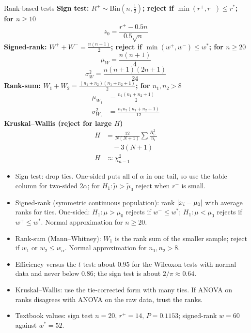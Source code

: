 \begin{formulabox}{Rank-based tests}
\textbf{Sign test: $R^+\sim\mathrm{Bin}(n,\tfrac12)$; reject if $\min(r^+,r^-)\le r^*$; for $n\ge10$}
\[ z_0=\frac{r^+-0.5n}{0.5\sqrt n} \]
\textbf{Signed-rank: $W^++W^-=\frac{n(n+1)}2$; reject if $\min(w^+,w^-)\le w^*$; for $n\ge20$}
\[ \mu_W=\frac{n(n+1)}{4} \]
\[ \sigma_W^2=\frac{n(n+1)(2n+1)}{24} \]
\textbf{Rank-sum: $W_1+W_2=\frac{(n_1+n_2)(n_1+n_2+1)}2$; for $n_1,n_2>8$}
\[ \begin{aligned}\mu_{W_1}&=\frac{n_1(n_1+n_2+1)}{2}\\[4pt] \sigma^2_{W_1}&=\frac{n_1n_2(n_1+n_2+1)}{12}\end{aligned} \]
\textbf{Kruskal--Wallis (reject for large $H$)}
\[ \begin{aligned}H&=\frac{12}{N(N+1)}\sum\frac{R_{i\cdot}^2}{n_i}\\ &\quad-3(N+1)\\ H&\approx\chi^2_{a-1}\end{aligned} \]
\end{formulabox}

\begin{notebox}
\begin{itemize}
  \item Sign test: drop ties. One-sided puts all of $\alpha$ in one tail, so use the table column for two-sided $2\alpha$; for $H_1:\tilde\mu>\tilde\mu_0$ reject when $r^-$ is small.
  \item Signed-rank (symmetric continuous population): rank $\lvert x_i-\mu_0\rvert$ with average ranks for ties. One-sided: $H_1:\mu>\mu_0$ rejects if $w^-\le w^*$; $H_1:\mu<\mu_0$ rejects if $w^+\le w^*$. Normal approximation for $n\ge20$.
  \item Rank-sum (Mann--Whitney): $W_1$ is the rank sum of the smaller sample; reject if $w_1$ or $w_2\le w_\alpha$. Normal approximation for $n_1,n_2>8$.
  \item Efficiency versus the $t$-test: about $0.95$ for the Wilcoxon tests with normal data and never below $0.86$; the sign test is about $2/\pi\approx0.64$.
  \item Kruskal--Wallis: use the tie-corrected form with many ties. If ANOVA on ranks disagrees with ANOVA on the raw data, trust the ranks.
  \item Textbook values: sign test $n=20$, $r^+=14$, $P=0.1153$; signed-rank $w=60$ against $w^*=52$.
\end{itemize}
\end{notebox}

